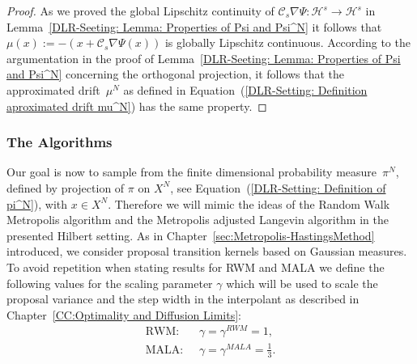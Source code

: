 \begin{proof}
 As we proved the global Lipschitz continuity of $\mathcal{C}_s\nabla \Psi: \mathcal{H}^s \to \mathcal{H}^s$ in Lemma~\ref{DLR-Seeting: Lemma: Properties of Psi and Psi^N} it follows that $\mu(x) := - (x + \mathcal{C}_s \nabla \Psi (x) )$ is globally Lipschitz continuous. According to the argumentation in the proof of Lemma~\ref{DLR-Seeting: Lemma: Properties of Psi and Psi^N} concerning the orthogonal projection, it follows that the approximated drift~$\mu^N$ as defined in Equation~(\ref{DLR-Setting: Definition aproximated drift mu^N}) has the same property.
\end{proof}


\subsubsection{The Algorithms}
\label{sec:sub:DLR-Algo}

Our goal is now to sample from the finite dimensional probability measure~$\pi^N$, defined by projection of $\pi$ on $X^N$, see Equation~(\ref{DLR-Setting: Definition of pi^N}), with $x \in X^N$. Therefore we will mimic the ideas of the Random Walk Metropolis algorithm and the Metropolis adjusted Langevin algorithm in the presented Hilbert setting. As in Chapter~\ref{sec:Metropolis-HastingsMethod} introduced, we consider proposal transition kernels based on Gaussian measures. To avoid repetition when stating results for RWM and MALA we define the following values for the scaling parameter $\gamma$ which will be used to scale the proposal variance and the step width in the interpolant as described in Chapter~\ref{CC:Optimality and Diffusion Limits}:
\begin{align}
 \text{RWM: } & \; \gamma = \gamma^{RWM} = 1, \\
 \text{MALA: } & \; \gamma = \gamma^{MALA} = \frac{1}{3}.
\end{align}


